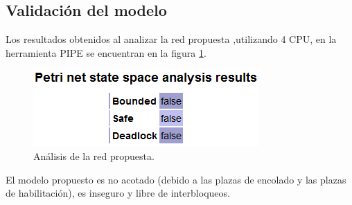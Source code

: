 \documentclass[a4paper]{book}
\begin{document}
\subsection{Validaci\'on del modelo}
Los resultados obtenidos al analizar la red propuesta ,utilizando 4 CPU, en la herramienta PIPE se encuentran en la figura \ref{Fig:validacion7}.

\begin{figure} [H]
	\begin{center}
        \includegraphics[scale=0.7]{./imagenes/it7validacion.png}
		\caption{An\'alisis de la red propuesta.}
		\label{Fig:validacion7}
	\end{center}
\end{figure}

El modelo propuesto es no acotado (debido a las plazas de encolado y las plazas de habilitaci\'on), es inseguro y libre de interbloqueos.
\end{document}
